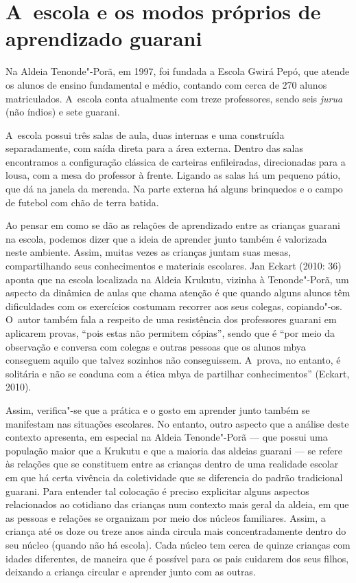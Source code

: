 \section{A~escola e os modos próprios de aprendizado guarani}

Na Aldeia Tenonde"-Porã, em 1997, foi fundada a Escola Gwirá Pepó, que
atende os alunos de ensino fundamental e médio, contando com cerca de
270 alunos matriculados. A~escola conta atualmente com treze
professores, sendo seis \emph{jurua} (não índios) e sete guarani.

A~escola possui três salas de aula, duas internas e uma construída
separadamente, com saída direta para a área externa. Dentro das salas
encontramos a configuração clássica de carteiras enfileiradas,
direcionadas para a lousa, com a mesa do professor à frente. Ligando as
salas há um pequeno pátio, que dá na janela da merenda. Na parte
externa há alguns brinquedos e o campo de futebol com chão de terra
batida. 

Ao pensar em como se dão as relações de aprendizado entre as crianças
guarani na escola, podemos dizer que a ideia de aprender junto também é
valorizada neste ambiente. Assim, muitas vezes as crianças juntam suas
mesas, compartilhando seus conhecimentos e materiais escolares. Jan
Eckart (2010: 36) aponta que na escola localizada na Aldeia Krukutu,
vizinha à Tenonde"-Porã, um aspecto da dinâmica de aulas que chama
atenção é que quando alguns alunos têm dificuldades com os exercícios
costumam recorrer aos seus colegas, copiando"-os. O~autor também fala a
respeito de uma resistência dos professores guarani em aplicarem
provas, ``pois estas não permitem cópias'', sendo que é ``por meio da
observação e conversa com colegas e outras pessoas que os alunos mbya
conseguem aquilo que talvez sozinhos não conseguissem. A~prova, no
entanto, é solitária e não se coaduna com a ética mbya de partilhar
conhecimentos'' (Eckart, 2010).

Assim, verifica"-se que a prática e o gosto em aprender junto também se
manifestam nas situações escolares. No entanto, outro aspecto que a
análise deste contexto apresenta, em especial na Aldeia Tenonde"-Porã ---
que possui uma população maior que a Krukutu e que a maioria das
aldeias guarani --- se refere às relações que se constituem entre as
crianças dentro de uma realidade escolar em que há certa vivência da
coletividade que se diferencia do padrão tradicional guarani. Para
entender tal colocação é preciso explicitar alguns aspectos
relacionados ao cotidiano das crianças num contexto mais geral da
aldeia, em que as pessoas e relações se organizam por meio dos núcleos
familiares. Assim, a criança até os doze ou treze anos ainda circula
mais concentradamente dentro do seu núcleo (quando não há escola). Cada
núcleo tem cerca de quinze crianças com idades diferentes, de maneira
que é possível para os pais cuidarem dos seus filhos, deixando a criança
circular e aprender junto com as outras.

